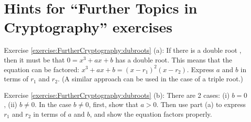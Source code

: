 \section{Hints for ``Further  Topics in Cryptography'' exercises}
\label{sec:FurtherCryptography:Hints}

\noindent Exercise \ref{exercise:FurtherCryptography:dubroots} (a):  If there is a double root , then it must be that $0 = x^3 + ax + b$ has a double root. This means that the equation can be factored:  $x^3 + ax+b = (x-r_1)^2(x-r_2)$.  Express $a$ and $b$ in terms of $r_1$ and $r_2$.  (A similar approach can be used in the case of a triple root.)  

\noindent Exercise \ref{exercise:FurtherCryptography:dubroots} (b):  There are 2 cases: (i) $b=0$, (ii) $b \neq 0$. In the case $b \neq 0$, first, show that $a > 0$.  Then use part (a) to express $r_1$ and $r_2$ in terms of $a$ and $b$, and show the equation factors properly.

